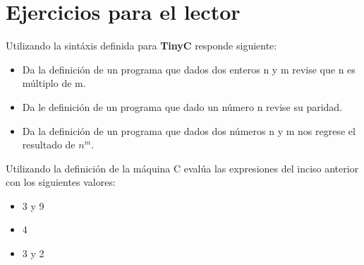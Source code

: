 \newpage

\section{Ejercicios para el lector}

\begin{exercise}
    Utilizando la sintáxis definida para \textbf{TinyC} responde siguiente: \\
    \begin{itemize}
        \item Da la definición de un programa que dados dos enteros n y m revise que n es múltiplo de m.
        \item Da le definición de un programa que dado un número n revise su paridad.
        \item Da la definición de un programa que dados dos números n y m nos regrese el resultado de $n^m$.
    \end{itemize}
\end{exercise}

\bigskip

\begin{exercise}
    Utilizando la definición de la máquina C evalúa las expresiones del inciso anterior con los siguientes valores:
    \begin{itemize}
        \item 3 y 9
        \item 4
        \item 3 y 2
    \end{itemize}
\end{exercise}